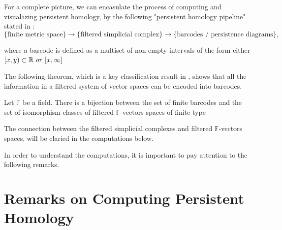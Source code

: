 \documentclass[11pt,a4paper]{report}
\begin{document}
              For a complete picture, we can encasulate the process of computing and visualazing persistent homology, by the following "persistent homology pipeline" stated in \cite{Rabadan_Blumberg_2019}:
              \[
               \{\textrm{finite metric space}\} \longrightarrow \{\textrm{filtered simplicial complex}\} \longrightarrow \{\textrm{barcodes / persistence diagrams}\},
              \]
              
              where a barcode is defined as a multiset of non-empty intervals of the form either
              $[x, y) \subset \mathbb{R} \ or \ [x, \infty]$
              
              The following theorem, which is a key classification result in \cite{Zomorodian_Carlsson_2005}, shows that all the information in a filtered system of vector spaces
              can be encoded into barcodes. 
              
              \begin{thm}
               Let $\mathbb{F}$ be a field. There is a bijection between the set of finite barcodes and
               the set of isomorphism classes of filtered $\mathbb{F}$-vectors spaces of finite type
              \end{thm}
              
              The connection between the filtered simplicial complexes and filtered $\mathbb{F}$-vectors spaces, will be claried in the computations below. 
              
              In order to understand the computations, it is important to pay attention to the following remarks. 
            
              \section*{Remarks on Computing Persistent Homology}
              
\end{document}
